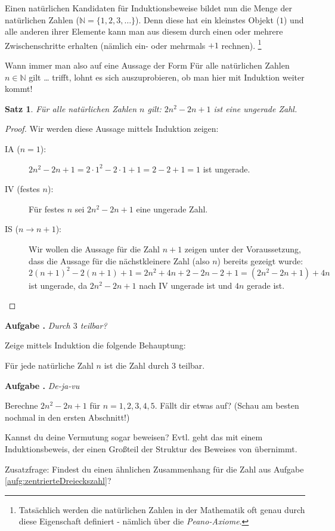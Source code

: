 \documentclass[a4paper,ngerman,12pt]{scrartcl}
\newcommand{\NN}{\mathbb{N}}
\theoremstyle{definition}
\theoremstyle{plain}
\newtheorem{satz}[defn]{Satz}
\theoremstyle{remark}
\newlength{\aufgabenskip}
\newcounter{aufgabennummer}
\newenvironment{aufgabe}[1]{
	\addtocounter{aufgabennummer}{1}
	\textbf{Aufgabe \theaufgabennummer.} \emph{#1} \par
}{\vspace{\aufgabenskip}}
\begin{document}
Einen natürlichen Kandidaten für Induktionsbeweise bildet nun die Menge der natürlichen Zahlen ($\mathbb{N} = \{1,2,3, \dots\}$). Denn diese hat ein kleinstes Objekt ($1$) und alle anderen ihrer Elemente kann man aus diesem durch einen oder mehrere Zwischenschritte erhalten (nämlich ein- oder mehrmals $+1$ rechnen).
\footnote{Tatsächlich werden die natürlichen Zahlen in der Mathematik oft genau durch diese Eigenschaft definiert - nämlich über die \emph{Peano-Axiome}.}

Wann immer man also auf eine Aussage der Form \glqq Für alle natürlichen Zahlen $n \in \NN$ gilt \dots\grqq{} trifft, lohnt es sich auszuprobieren, ob man hier mit Induktion weiter kommt!

\begin{satz}\label{satz:zentrierteViereckszahl}
	Für alle natürlichen Zahlen $n$ gilt: $2n^2-2n+1$ ist eine ungerade Zahl.
\end{satz}

\begin{proof}
	Wir werden diese Aussage mittels Induktion zeigen:
	\begin{description}
		\item[IA ($n=1$):] $2n^2-2n+1  = 2\cdot 1^2 -2 \cdot 1 + 1 = 2-2+1 = 1$ ist ungerade.
		\item[IV (festes $n$):] Für festes $n$ sei $2n^2-2n+1$ eine ungerade Zahl.
		\item[IS ($n \to n+1$):] Wir wollen die Aussage für die Zahl $n+1$ zeigen unter der Voraussetzung, dass die Aussage für die nächstkleinere Zahl (also $n$) bereits gezeigt wurde:
		\[2(n+1)^2-2(n+1)+1  = 2n^2+4n+2-2n-2+1 = (2n^2-2n+1) + 4n\]
		ist ungerade, da $2n^2-2n+1$ nach IV ungerade ist und $4n$ gerade ist. \qedhere
	\end{description}
\end{proof}

\begin{aufgabe}{Durch $3$ teilbar?}\label{aufg:zentrierteDreieckszahl}
	Zeige mittels Induktion die folgende Behauptung:
	
	Für jede natürliche Zahl $n$ ist die Zahl  durch $3$ teilbar.
\end{aufgabe}

\begin{aufgabe}{De-ja-vu}\label{aufg:dejavu}
	Berechne $2n^2-2n+1$ für $n = 1,2,3,4,5$. Fällt dir etwas auf? (Schau am besten nochmal in den ersten Abschnitt!) 
	
	Kannst du deine Vermutung sogar beweisen? Evtl. geht das mit einem Induktionsbeweis, der einen Großteil der Struktur des Beweises von  übernimmt.
	
	Zusatzfrage: Findest du einen ähnlichen Zusammenhang für die Zahl aus Aufgabe \ref{aufg:zentrierteDreieckszahl}?
\end{aufgabe}
\end{document}
